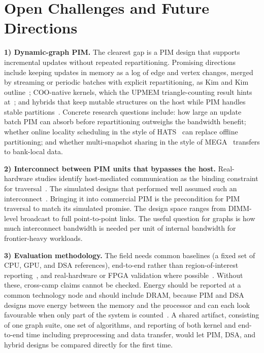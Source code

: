 \documentclass[journal,onecolumn]{IEEEtran}
\begin{document}
\section{Open Challenges and Future Directions}\label{sec:open}
\textbf{1) Dynamic-graph PIM.} The clearest gap is a PIM design that supports incremental updates without repeated repartitioning. Promising directions include keeping updates in memory as a log of edge and vertex changes, merged by streaming or periodic batches with explicit repartitioning, as Kim and Kim outline~\cite{kim2020dynamic}; COO-native kernels, which the UPMEM triangle-counting result hints at~\cite{asquini2025tc}; and hybrids that keep mutable structures on the host while PIM handles stable partitions~\cite{shin2025fala}. Concrete research questions include: how large an update batch PIM can absorb before repartitioning outweighs the bandwidth benefit; whether online locality scheduling in the style of HATS~\cite{mukkara2018hats} can replace offline partitioning; and whether multi-snapshot sharing in the style of MEGA~\cite{gao2023mega} transfers to bank-local data.

\textbf{2) Interconnect between PIM units that bypasses the host.} Real-hardware studies identify host-mediated communication as the binding constraint for traversal~\cite{gomezluna2022prim,barkhordar2025alphapim}. The simulated designs that performed well assumed such an interconnect~\cite{ahn2015tesseract,zhuo2019graphq}. Bringing it into commercial PIM is the precondition for PIM traversal to match its simulated promise. The design space ranges from DIMM-level broadcast to full point-to-point links. The useful question for graphs is how much interconnect bandwidth is needed per unit of internal bandwidth for frontier-heavy workloads.

\textbf{3) Evaluation methodology.} The field needs common baselines (a fixed set of CPU, GPU, and DSA references), end-to-end rather than region-of-interest reporting~\cite{yenimol2026cograf}, and real-hardware or FPGA validation where possible~\cite{shin2025piccolo,chen2022regraph}. Without these, cross-camp claims cannot be checked. Energy should be reported at a common technology node and should include DRAM, because PIM and DSA designs move energy between the memory and the processor and can each look favourable when only part of the system is counted~\cite{yenimol2026cograf,ham2016graphicionado}. A shared artifact, consisting of one graph suite, one set of algorithms, and reporting of both kernel and end-to-end time including preprocessing and data transfer, would let PIM, DSA, and hybrid designs be compared directly for the first time.
\end{document}
